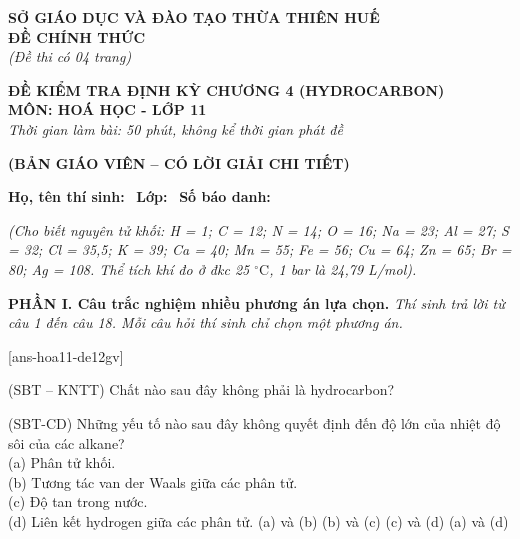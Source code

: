 \documentclass[12pt,a4paper]{article}
\begin{document}
\thispagestyle{firstpage}

\noindent
\begin{minipage}[t]{0.44\textwidth}
	\centering\fontsize{10pt}{12pt}\selectfont
	\textbf{SỞ GIÁO DỤC VÀ ĐÀO TẠO THỪA THIÊN HUẾ}\\
	\textbf{ĐỀ CHÍNH THỨC}\\
	\textit{(Đề thi có 04 trang)}
\end{minipage}\hfill
\begin{minipage}[t]{0.54\textwidth}
	\centering\fontsize{10.5pt}{13pt}\selectfont
	\textbf{ĐỀ KIỂM TRA ĐỊNH KỲ CHƯƠNG 4 (HYDROCARBON)}\\
	\textbf{MÔN: HOÁ HỌC - LỚP 11}\\
	\textit{Thời gian làm bài: 50 phút, không kể thời gian phát đề}
	
	\smallskip
\end{minipage}

\smallskip
\begin{center}
	{\color{hfRed}\textbf{\large (BẢN GIÁO VIÊN -- CÓ LỜI GIẢI CHI TIẾT)}}
\end{center}

\smallskip
\noindent\hrulefill
\smallskip

\noindent\textbf{Họ, tên thí sinh:} \dotfill\ \textbf{Lớp:} \dotfill\ \textbf{Số báo danh:} \dotfill

\smallskip
\noindent\textit{(Cho biết nguyên tử khối: H = 1; C = 12; N = 14; O = 16; Na = 23; Al = 27; S = 32; Cl = 35,5; K = 39; Ca = 40; Mn = 55; Fe = 56; Cu = 64; Zn = 65; Br = 80; Ag = 108. Thể tích khí đo ở đkc 25 $^\circ\text{C}$, 1 bar là 24,79 L/mol).}
\smallskip

\noindent\textbf{\large PHẦN I. Câu trắc nghiệm nhiều phương án lựa chọn.}
\textit{Thí sinh trả lời từ câu 1 đến câu 18. Mỗi câu hỏi thí sinh chỉ chọn một phương án.}
\vspace{0.2cm}

[ans-hoa11-de12gv]

\begin{ex}
(SBT -- KNTT) Chất nào sau đây không phải là hydrocarbon?
\choice
{}
{}
{}
{\True {}}
\end{ex}

\begin{ex}
(SBT-CD) Những yếu tố nào sau đây không quyết định đến độ lớn của nhiệt độ sôi của các alkane?\\
(a) Phân tử khối.\\
(b) Tương tác van der Waals giữa các phân tử.\\
(c) Độ tan trong nước.\\
(d) Liên kết hydrogen giữa các phân tử.
\choice
{(a) và (b)}
{(b) và (c)}
{\True (c) và (d)}
{(a) và (d)}
\end{ex}
\end{document}
